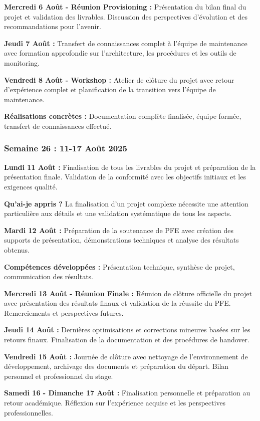 \documentclass[a4paper,12pt]{article}
\begin{document}
\textbf{Mercredi 6 Août - Réunion Provisioning :}
Présentation du bilan final du projet et validation des livrables. Discussion des perspectives d'évolution et des recommandations pour l'avenir.

\textbf{Jeudi 7 Août :}
Transfert de connaissances complet à l'équipe de maintenance avec formation approfondie sur l'architecture, les procédures et les outils de monitoring.

\textbf{Vendredi 8 Août - Workshop :}
Atelier de clôture du projet avec retour d'expérience complet et planification de la transition vers l'équipe de maintenance.

\textbf{Réalisations concrètes :} Documentation complète finalisée, équipe formée, transfert de connaissances effectué.

\subsubsection{Semaine 26 : 11-17 Août 2025}

\textbf{Lundi 11 Août :}
Finalisation de tous les livrables du projet et préparation de la présentation finale. Validation de la conformité avec les objectifs initiaux et les exigences qualité.

\textbf{Qu'ai-je appris ?} La finalisation d'un projet complexe nécessite une attention particulière aux détails et une validation systématique de tous les aspects.

\textbf{Mardi 12 Août :}
Préparation de la soutenance de PFE avec création des supports de présentation, démonstrations techniques et analyse des résultats obtenus.

\textbf{Compétences développées :} Présentation technique, synthèse de projet, communication des résultats.

\textbf{Mercredi 13 Août - Réunion Finale :}
Réunion de clôture officielle du projet avec présentation des résultats finaux et validation de la réussite du PFE. Remerciements et perspectives futures.

\textbf{Jeudi 14 Août :}
Dernières optimisations et corrections mineures basées sur les retours finaux. Finalisation de la documentation et des procédures de handover.

\textbf{Vendredi 15 Août :}
Journée de clôture avec nettoyage de l'environnement de développement, archivage des documents et préparation du départ. Bilan personnel et professionnel du stage.

\textbf{Samedi 16 - Dimanche 17 Août :}
Finalisation personnelle et préparation au retour académique. Réflexion sur l'expérience acquise et les perspectives professionnelles.
\end{document}
